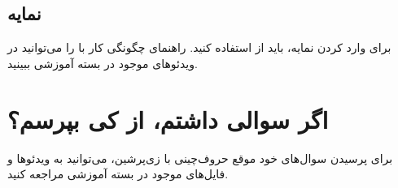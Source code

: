 \subsection{نمایه}
برای وارد کردن نمایه، باید از 
استفاده کنید. 
راهنمای چگونگی کار با 
را می‌توانید در ویدئوهای موجود در بسته آموزشی ببینید.

\section{اگر سوالی داشتم، از کی بپرسم؟}
برای پرسیدن سوال‌های خود موقع حروف‌چینی با زی‌پرشین،  می‌توانید به ویدئوها و فایل‌های موجود در بسته آموزشی مراجعه کنید.
